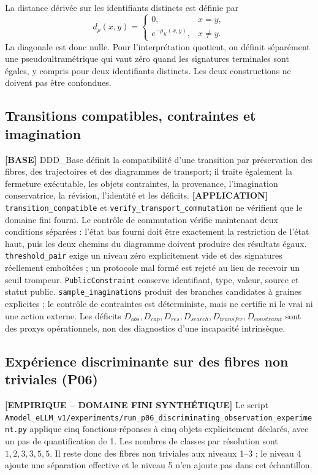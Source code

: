 \documentclass[11pt,a4paper]{article}
\begin{document}
La distance dérivée sur les identifiants distincts est définie par
\[
d_\rho(x,y)=\begin{cases}0,&x=y,\\ e^{-\rho_K(x,y)},&x\ne y.\end{cases}
\]
La diagonale est donc nulle. Pour l'interprétation quotient, on définit séparément une pseudoultramétrique qui vaut zéro quand les signatures terminales sont égales, y compris pour deux identifiants distincts. Les deux constructions ne doivent pas être confondues.

\subsection{Transitions compatibles, contraintes et imagination}
\textbf{[BASE]} DDD\_Base définit la compatibilité d'une transition par préservation des fibres, des trajectoires et des diagrammes de transport; il traite également la fermeture exécutable, les objets contraintes, la provenance, l'imagination conservatrice, la révision, l'identité et les déficits.
\textbf{[APPLICATION]} \texttt{transition\_compatible} et \texttt{verify\_transport\_commutation} ne vérifient que le domaine fini fourni. Le contrôle de commutation vérifie maintenant deux conditions séparées : l'état bas fourni doit être exactement la restriction de l'état haut, puis les deux chemins du diagramme doivent produire des résultats égaux. \texttt{threshold\_pair} exige un niveau zéro explicitement vide et des signatures réellement emboîtées ; un protocole mal formé est rejeté au lieu de recevoir un seuil trompeur. \texttt{PublicConstraint} conserve identifiant, type, valeur, source et statut public. \texttt{sample\_imaginations} produit des branches candidates à graines explicites ; le contrôle de contraintes est déterministe, mais ne certifie ni le vrai ni une action externe. Les déficits \(D_{obs},D_{cap},D_{res},D_{search},D_{transfer},D_{constraint}\) sont des proxys opérationnels, non des diagnostics d'une incapacité intrinsèque.

\subsection{Expérience discriminante sur des fibres non triviales (P06)}
\textbf{[EMPIRIQUE -- DOMAINE FINI SYNTHÉTIQUE]} Le script \texttt{Amodel\_eLLM\_v1/experiments/run\_p06\_discriminating\_observation\_experiment.py} applique cinq fonctions-réponses à cinq objets explicitement déclarés, avec un pas de quantification de 1. Les nombres de classes par résolution sont \(1,2,3,3,5,5\). Il reste donc des fibres non triviales aux niveaux 1--3 ; le niveau 4 ajoute une séparation effective et le niveau 5 n'en ajoute pas dans cet échantillon.
\end{document}
